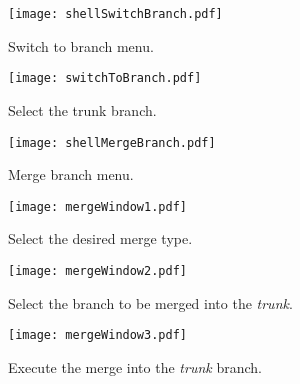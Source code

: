 \begin{figure}[htbp]
\begin{subfigure}{0.5\textwidth}
  \centering
    \texttt{[image: shellSwitchBranch.pdf]}
    \caption{Switch to branch menu.}
    \label{fig:shellSwitchBranch}
\end{subfigure}%
\begin{subfigure}{0.5\textwidth}
  \centering
    \texttt{[image: switchToBranch.pdf]}
    \caption{Select the trunk branch.}
    \label{fig:switchToBranch}
\end{subfigure}%
\caption{}
\label{fig:switchShells}
\end{figure}




\begin{figure}[htbp]
\begin{subfigure}{0.5\textwidth}
  \centering
    \texttt{[image: shellMergeBranch.pdf]}
    \caption{Merge branch menu.}
    \label{fig:shellMergeBranch}
\end{subfigure}%
\begin{subfigure}{0.49\textwidth}
  \centering
    \texttt{[image: mergeWindow1.pdf]}
    \caption{Select the desired merge type.}
    \label{fig:mergeWindow1}
\end{subfigure}%
\caption{}
\label{fig:mergeShells}
\end{figure}




\begin{figure}[htbp]
\begin{subfigure}{0.48\textwidth}
  \centering
  \texttt{[image: mergeWindow2.pdf]}
  \caption{Select the branch to be merged into the \textit{trunk}.}
  \label{fig:mergeWindow2}
\end{subfigure}%
\hspace{2mm}
\begin{subfigure}{0.45\textwidth}
  \centering
  \texttt{[image: mergeWindow3.pdf]}
  \caption{Execute the merge into the \textit{trunk} branch.}
  \label{fig:mergeWindow3}
\end{subfigure}%
\caption{}
\label{fig:mergeWindows}
\end{figure}


